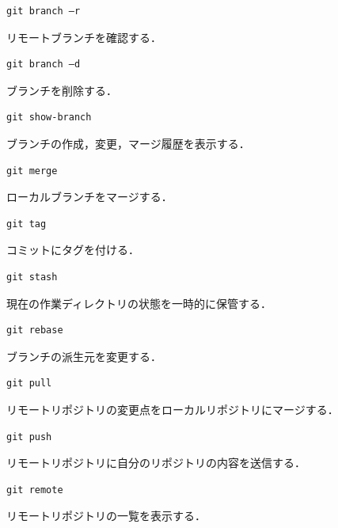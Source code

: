 \begin{lstlisting}[basicstyle=\ttfamily\footnotesize, frame=single]
git branch –r
\end{lstlisting}
リモートブランチを確認する．

\begin{lstlisting}[basicstyle=\ttfamily\footnotesize, frame=single]
git branch –d
\end{lstlisting}
ブランチを削除する．

\hfil
\begin{lstlisting}[basicstyle=\ttfamily\footnotesize, frame=single]
git show-branch
\end{lstlisting}
ブランチの作成，変更，マージ履歴を表示する．

\hfil
\begin{lstlisting}[basicstyle=\ttfamily\footnotesize, frame=single]
git merge
\end{lstlisting}
ローカルブランチをマージする．

\hfil
\begin{lstlisting}[basicstyle=\ttfamily\footnotesize, frame=single]
git tag
\end{lstlisting}
コミットにタグを付ける．

\hfil
\begin{lstlisting}[basicstyle=\ttfamily\footnotesize, frame=single]
git stash
\end{lstlisting}
現在の作業ディレクトリの状態を一時的に保管する．

\hfil
\begin{lstlisting}[basicstyle=\ttfamily\footnotesize, frame=single]
git rebase
\end{lstlisting}
ブランチの派生元を変更する．

\hfil
\begin{lstlisting}[basicstyle=\ttfamily\footnotesize, frame=single]
git pull
\end{lstlisting}
リモートリポジトリの変更点をローカルリポジトリにマージする．

\hfil
\begin{lstlisting}[basicstyle=\ttfamily\footnotesize, frame=single]
git push
\end{lstlisting}
リモートリポジトリに自分のリポジトリの内容を送信する．

\newpage

\begin{lstlisting}[basicstyle=\ttfamily\footnotesize, frame=single]
git remote
\end{lstlisting}
リモートリポジトリの一覧を表示する．

